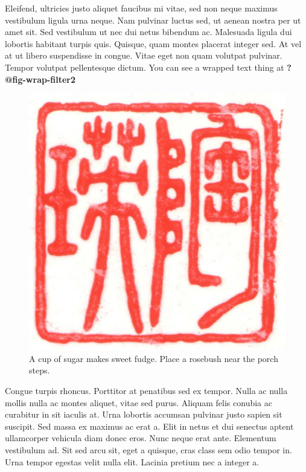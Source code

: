 \documentclass[
  9pt,
  letterpaper,
  DIV=11,
  numbers=noendperiod]{scrartcl}
\begin{document}
Eleifend, ultricies justo aliquet faucibus mi vitae, sed non neque
maximus vestibulum ligula urna neque. Nam pulvinar luctus sed, ut aenean
nostra per ut amet sit. Sed vestibulum ut nec dui netus bibendum ac.
Malesuada ligula dui lobortis habitant turpis quis. Quisque, quam montes
placerat integer sed. At vel at ut libero suspendisse in congue. Vitae
eget non quam volutpat pulvinar. Tempor volutpat pellentesque dictum.
You can see a wrapped text thing at \textbf{?@fig-wrap-filter2}

\begin{figure}\centering\includegraphics{stamp1a.jpg}\caption{\label{fig-wrap-filter2}
A cup of sugar makes sweet fudge. Place a rosebush near the porch
steps.}\end{figure}

Congue turpis rhoncus. Porttitor at penatibus sed ex tempor. Nulla ac
nulla mollis nulla ac montes aliquet, vitae sed purus. Aliquam felis
conubia ac curabitur in sit iaculis at. Urna lobortis accumsan pulvinar
justo sapien sit suscipit. Sed massa ex maximus ac erat a. Elit in netus
et dui senectus aptent ullamcorper vehicula diam donec eros. Nunc neque
erat ante. Elementum vestibulum ad. Sit sed arcu sit, eget a quisque,
cras class sem odio tempor in. Urna tempor egestas velit nulla elit.
Lacinia pretium nec a integer a.
\end{document}
